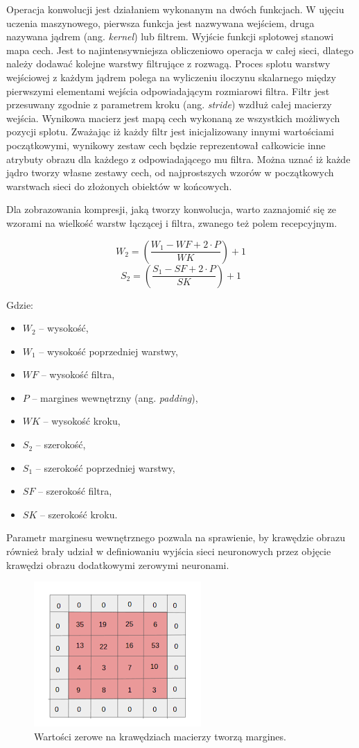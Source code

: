\documentclass[12pt,a4paper,twoside,titlepage,openright]{book}
\begin{document}
\begin{itemize}
Operacja konwolucji jest działaniem wykonanym na dwóch funkcjach. W ujęciu uczenia maszynowego, pierwsza funkcja jest nazwywana wejściem, druga nazywana jądrem (ang. \textit{kernel}) lub filtrem. Wyjście funkcji splotowej stanowi mapa cech. Jest to najintensywniejsza obliczeniowo operacja w całej sieci, dlatego należy dodawać kolejne warstwy filtrujące z rozwagą. Proces splotu warstwy wejściowej z każdym jądrem polega na wyliczeniu iloczynu skalarnego między pierwszymi elementami wejścia odpowiadającym rozmiarowi filtra. Filtr jest przesuwany zgodnie z parametrem kroku (ang. \textit{stride}) wzdłuż całej macierzy wejścia. Wynikowa macierz jest mapą cech wykonaną ze wszystkich możliwych pozycji splotu. Zważając iż każdy filtr jest inicjalizowany innymi wartościami początkowymi, wynikowy zestaw cech będzie reprezentował całkowicie inne atrybuty obrazu dla każdego z odpowiadającego mu filtra. Można uznać iż każde jądro tworzy własne zestawy cech, od najprostszych wzorów w początkowych warstwach sieci do złożonych obiektów w końcowych.

Dla zobrazowania kompresji, jaką tworzy konwolucja, warto zaznajomić się ze wzorami na wielkość warstw łączącej i filtra, zwanego też polem recepcyjnym.


$$ W_2 = (\frac{W_1 - WF + 2 \cdot P}{WK}) + 1 $$ 
$$ S_2 = (\frac{S_1 - SF + 2 \cdot P}{SK}) + 1 $$


Gdzie:
\begin{itemize}
\item $W_2$ -- wysokość,
\item $W_1$ -- wysokość poprzedniej warstwy,
\item $WF$ -- wysokość filtra,
\item $P$ -- margines wewnętrzny (ang. \textit{padding}),
\item $WK$ -- wysokość kroku,
\item $S_2$ -- szerokość,
\item $S_1$ -- szerokość poprzedniej warstwy,
\item $SF$ -- szerokość filtra,
\item $SK$ -- szerokość kroku.
\end{itemize}

Parametr marginesu wewnętrznego pozwala na sprawienie, by krawędzie obrazu również brały udział w definiowaniu wyjścia sieci neuronowych przez objęcie krawędzi obrazu dodatkowymi zerowymi neuronami. 

\begin{figure}[ht]
	\centering
			\includegraphics[resolution=100]{Padding.png}
		\caption{Wartości zerowe na krawędziach macierzy tworzą margines.}
\end{figure}


\end{itemize}
\end{document}
